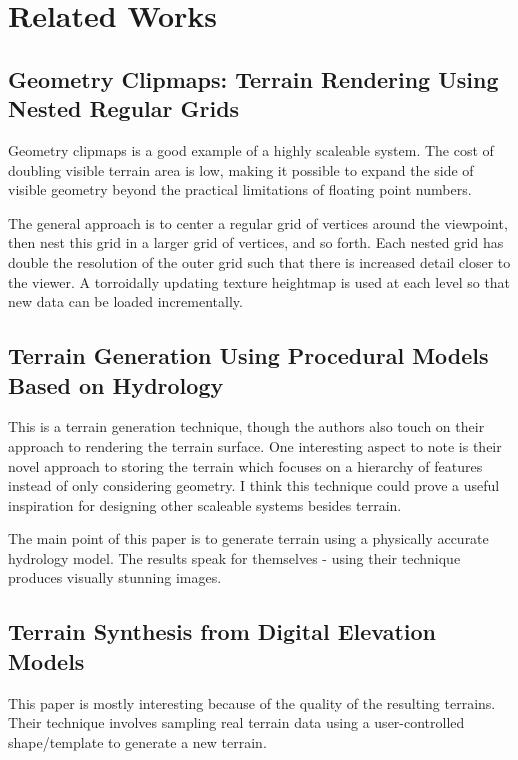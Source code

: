 
\chapter{Related Works}

\section{Geometry Clipmaps: Terrain Rendering Using Nested Regular Grids}

Geometry clipmaps is a good example of a highly scaleable system.
The cost of doubling visible terrain area is low, making it possible to expand the side of visible geometry beyond the practical limitations of floating point numbers. \cite{geometry_clipmaps}

The general approach is to center a regular grid of vertices around the viewpoint, then nest this grid in a larger grid of vertices, and so forth.
Each nested grid has double the resolution of the outer grid such that there is increased detail closer to the viewer.
A torroidally updating texture heightmap is used at each level so that new data can be loaded incrementally.


\section{Terrain Generation Using Procedural Models Based on Hydrology}

This is a terrain generation technique, though the authors also touch on their approach to rendering the terrain surface.
One interesting aspect to note is their novel approach to storing the terrain which focuses on a hierarchy of features instead of only considering geometry.
I think this technique could prove a useful inspiration for designing other scaleable systems besides terrain.

The main point of this paper is to generate terrain using a physically accurate hydrology model.
The results speak for themselves - using their technique produces visually stunning images.


\section{Terrain Synthesis from Digital Elevation Models}

This paper is mostly interesting because of the quality of the resulting terrains.
Their technique involves sampling real terrain data using a user-controlled shape/template to generate a new terrain.

